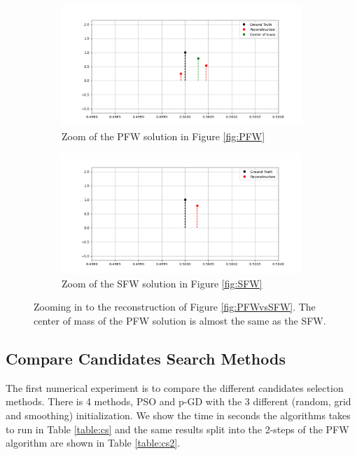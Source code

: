 \documentclass[a4paper,12pt,oneside]{report}
\theoremstyle{named}
\begin{document}
\begin{figure}
\centering
\begin{subfigure}[b]{1\textwidth}
   \includegraphics[width=1\linewidth]{PFW_cm.png}
   \caption{Zoom of the PFW solution in Figure \ref{fig:PFW}}
   \label{fig:PFW_cm} 
\end{subfigure}

\begin{subfigure}[b]{1\textwidth}
   \includegraphics[width=1\linewidth]{SFW_cm.png}
   \caption{Zoom of the SFW solution in Figure \ref{fig:SFW}}
   \label{fig:SFW_cm}
\end{subfigure}

\caption{Zooming in to the reconstruction of Figure \ref{fig:PFWvsSFW}. The center of mass of the PFW solution is almost the same as the SFW.}
\label{fig:PFWvsSFW_cm}
\end{figure}

\subsection{Compare Candidates Search Methods}
The first numerical experiment is to compare the different candidates selection methods. There is 4 methods, PSO and p-GD with the 3 different (random, grid and smoothing) initialization. We show the time in seconds the algorithms takes to run in Table \ref{table:cs} and the same results split into the 2-steps of the PFW algorithm are shown in Table \ref{table:cs2}. \\
\end{document}
